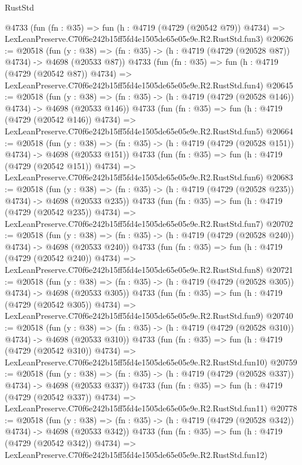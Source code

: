 \begin{lexlean}{RustStd}
\begin{coremodule}
    @4733
    (fun (fn : @35) =>
    fun (h : @4719 (@4729 (@20542 @79)) @4734) =>
    LexLeanPreserve.C70f6e242b15ff5fd4e1505de65e05e9e.R2.RustStd.fun3)
@20626 := @20518
    (fun (y : @38) => (fn : @35) -> (h : @4719 (@4729 (@20528 @87)) @4734) -> @4698 (@20533 @87))
    @4733
    (fun (fn : @35) =>
    fun (h : @4719 (@4729 (@20542 @87)) @4734) =>
    LexLeanPreserve.C70f6e242b15ff5fd4e1505de65e05e9e.R2.RustStd.fun4)
@20645 := @20518
    (fun (y : @38) => (fn : @35) -> (h : @4719 (@4729 (@20528 @146)) @4734) -> @4698 (@20533 @146))
    @4733
    (fun (fn : @35) =>
    fun (h : @4719 (@4729 (@20542 @146)) @4734) =>
    LexLeanPreserve.C70f6e242b15ff5fd4e1505de65e05e9e.R2.RustStd.fun5)
@20664 := @20518
    (fun (y : @38) => (fn : @35) -> (h : @4719 (@4729 (@20528 @151)) @4734) -> @4698 (@20533 @151))
    @4733
    (fun (fn : @35) =>
    fun (h : @4719 (@4729 (@20542 @151)) @4734) =>
    LexLeanPreserve.C70f6e242b15ff5fd4e1505de65e05e9e.R2.RustStd.fun6)
@20683 := @20518
    (fun (y : @38) => (fn : @35) -> (h : @4719 (@4729 (@20528 @235)) @4734) -> @4698 (@20533 @235))
    @4733
    (fun (fn : @35) =>
    fun (h : @4719 (@4729 (@20542 @235)) @4734) =>
    LexLeanPreserve.C70f6e242b15ff5fd4e1505de65e05e9e.R2.RustStd.fun7)
@20702 := @20518
    (fun (y : @38) => (fn : @35) -> (h : @4719 (@4729 (@20528 @240)) @4734) -> @4698 (@20533 @240))
    @4733
    (fun (fn : @35) =>
    fun (h : @4719 (@4729 (@20542 @240)) @4734) =>
    LexLeanPreserve.C70f6e242b15ff5fd4e1505de65e05e9e.R2.RustStd.fun8)
@20721 := @20518
    (fun (y : @38) => (fn : @35) -> (h : @4719 (@4729 (@20528 @305)) @4734) -> @4698 (@20533 @305))
    @4733
    (fun (fn : @35) =>
    fun (h : @4719 (@4729 (@20542 @305)) @4734) =>
    LexLeanPreserve.C70f6e242b15ff5fd4e1505de65e05e9e.R2.RustStd.fun9)
@20740 := @20518
    (fun (y : @38) => (fn : @35) -> (h : @4719 (@4729 (@20528 @310)) @4734) -> @4698 (@20533 @310))
    @4733
    (fun (fn : @35) =>
    fun (h : @4719 (@4729 (@20542 @310)) @4734) =>
    LexLeanPreserve.C70f6e242b15ff5fd4e1505de65e05e9e.R2.RustStd.fun10)
@20759 := @20518
    (fun (y : @38) => (fn : @35) -> (h : @4719 (@4729 (@20528 @337)) @4734) -> @4698 (@20533 @337))
    @4733
    (fun (fn : @35) =>
    fun (h : @4719 (@4729 (@20542 @337)) @4734) =>
    LexLeanPreserve.C70f6e242b15ff5fd4e1505de65e05e9e.R2.RustStd.fun11)
@20778 := @20518
    (fun (y : @38) => (fn : @35) -> (h : @4719 (@4729 (@20528 @342)) @4734) -> @4698 (@20533 @342))
    @4733
    (fun (fn : @35) =>
    fun (h : @4719 (@4729 (@20542 @342)) @4734) =>
    LexLeanPreserve.C70f6e242b15ff5fd4e1505de65e05e9e.R2.RustStd.fun12)

\end{coremodule}
\end{lexlean}
